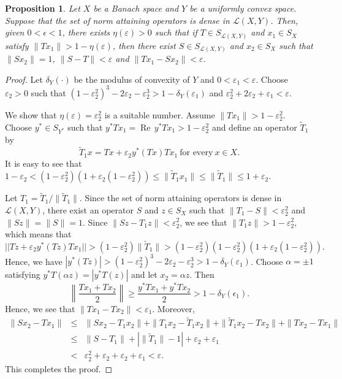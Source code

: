 \documentclass[a4paper]{amsart}
\theoremstyle{plain}
\newtheorem{proposition}[theorem]{Proposition}
\theoremstyle{definition}
\begin{document}
\begin{proposition}\label{prop}
Let $X$ be a Banach space and $Y$ be a uniformly convex space. Suppose that the set of norm attaining operators is dense in $\mathcal{L}(X,Y)$. Then, given $0<\epsilon<1$,  there exists $\eta({\varepsilon})>0$ such that if $T\in S_{\mathcal{L}(X,Y)}$ and $x_1\in S_X$ satisfy $\|Tx_1\|>1-\eta({\varepsilon})$, then there exist $S\in S_{\mathcal{L}(X,Y)}$ and $x_2\in S_X$ such that $\|Sx_2\|=1$, $\|S-T\|<{\varepsilon}$ and $\|Tx_1-Sx_2\|<{\varepsilon}$.
\end{proposition}
\begin{proof}
Let $\delta_Y(\cdot)$ be the modulus of convexity of $Y$ and $0<{\varepsilon}_1<{\varepsilon}$. Choose ${\varepsilon}_2>0$ such that $(1-{\varepsilon}_2^2)^3-2{\varepsilon}_2-{\varepsilon}_2^3>1-\delta_Y({\varepsilon}_1)$ and ${\varepsilon}^2_2+2{\varepsilon}_2+{\varepsilon}_1<{\varepsilon}$.

  We show that $\eta({\varepsilon})={\varepsilon}_2^2$ is a suitable number. Assume $\|Tx_1\|>1-{\varepsilon}_2^2$.
Choose $y^*\in S_{Y^*}$ such that $y^*Tx_1=\operatorname{Re\,} y^*Tx_1>1-{\varepsilon}_2^2$ and define an operator $\tilde{T}_1$ by
$$\tilde{T}_1x=Tx+{\varepsilon}_2y^*(Tx)Tx_1~\text{for every}~x\in X.$$
It is easy to see that $1-{\varepsilon}_2<(1-{\varepsilon}_2^2)(1+{\varepsilon}_2(1-{\varepsilon}_2^2)){\leqslant} \|\tilde{T}_1x_1\|{\leqslant}\|\tilde{T}_1\|{\leqslant} 1+{\varepsilon}_2$.

Let $T_1=\tilde{T}_1/\|\tilde{T}_1\|$. Since the set of norm attaining operators is dense in $\mathcal{L}(X,Y)$, there exist an operator $S$ and $z\in S_X$ such that $\|T_1-S\|<{\varepsilon}_2^2$ and $\|Sz\|=\|S\|=1$.
Since $\|Sz-T_1z\|<{\varepsilon}_2^2$, we see that $\|T_1z\|>1-{\varepsilon}_2^2$, which means that
 $$||Tz+{\varepsilon}_2y^*(Tz)Tx_1||>(1-{\varepsilon}_2^2)\|\tilde{T}_1\|>(1-{\varepsilon}_2^2)(1-{\varepsilon}_2^2)(1+{\varepsilon}_2(1-{\varepsilon}_2^2)).$$
 Hence, we have $|y^*(Tz)|>(1-{\varepsilon}_2^2)^3-2{\varepsilon}_2-{\varepsilon}_2^3>1-\delta_Y({\varepsilon}_1)$. Choose $\alpha=\pm 1$ satisfying $y^*T(\alpha z) = |y^*T(z)|$ and  let $x_2 = \alpha z$. Then
 \[\left\|  \frac{Tx_1 + Tx_2 }{2}\right\| {\geqslant}   \frac{y^*Tx_1 + y^*Tx_2 }{2}>1-\delta_Y(\epsilon_1).\]
Hence, we see that $\|Tx_1-Tx_2\|<{\varepsilon}_1$.
Moreover,
  \begin{eqnarray*}
\|Sx_2-Tx_1\|
&{\leqslant} &\|Sx_2-T_1x_2\|+\|T_1x_2-\tilde{T}_1x_2\|+\|\tilde{T}_1x_2-Tx_2\|+\|Tx_2-Tx_1\|\\
&{\leqslant}&\|S-T_1\|+|\|\tilde{T}_1\|-1|+{\varepsilon}_2+{\varepsilon}_1\\
&<& {\varepsilon}^2_2+{\varepsilon}_2+{\varepsilon}_2+{\varepsilon}_1<{\varepsilon}.
   \end{eqnarray*} This completes the proof.
\end{proof}
\end{document}
